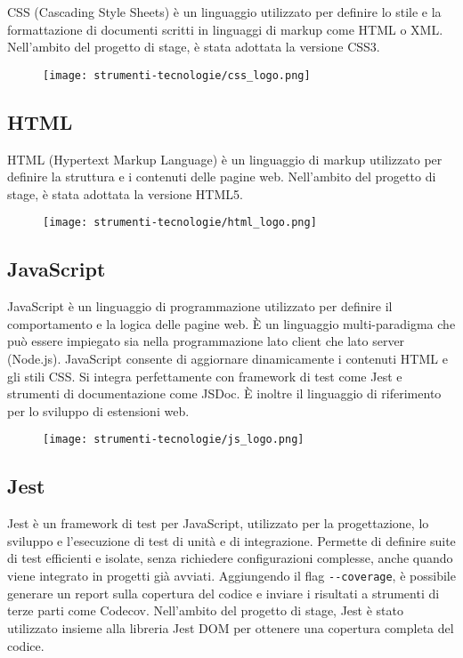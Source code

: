 \par CSS (Cascading Style Sheets) è un linguaggio utilizzato per definire lo stile e la formattazione di documenti scritti in linguaggi di markup come HTML o XML. Nell’ambito del progetto di stage, è stata adottata la versione CSS3.

\begin{figure}[H]
    \centering 
    \texttt{[image: strumenti-tecnologie/css\_logo.png]} 
\end{figure}

\subsection*{HTML}

\par HTML (Hypertext Markup Language) è un linguaggio di markup utilizzato per definire la struttura e i contenuti delle pagine web. Nell’ambito del progetto di stage, è stata adottata la versione HTML5.

\begin{figure}[H]
    \centering 
    \texttt{[image: strumenti-tecnologie/html\_logo.png]} 
\end{figure}

\subsection*{JavaScript}

\par JavaScript è un linguaggio di programmazione utilizzato per definire il comportamento e la logica delle pagine web. È un linguaggio multi-paradigma che può essere impiegato sia nella programmazione lato client che lato server (Node.js). JavaScript consente di aggiornare dinamicamente i contenuti HTML e gli stili CSS. Si integra perfettamente con framework di test come Jest e strumenti di documentazione come JSDoc. È inoltre il linguaggio di riferimento per lo sviluppo di estensioni web.

\begin{figure}[H]
    \centering 
    \texttt{[image: strumenti-tecnologie/js\_logo.png]} 
\end{figure}

\subsection*{Jest}

\par Jest è un framework di test per JavaScript, utilizzato per la progettazione, lo sviluppo e l’esecuzione di test di unità e di integrazione. Permette di definire suite di test efficienti e isolate, senza richiedere configurazioni complesse, anche quando viene integrato in progetti già avviati. Aggiungendo il flag \verb|--coverage|, è possibile generare un report sulla copertura del codice e inviare i risultati a strumenti di terze parti come Codecov. Nell’ambito del progetto di stage, Jest è stato utilizzato insieme alla libreria Jest DOM per ottenere una copertura completa del codice.

